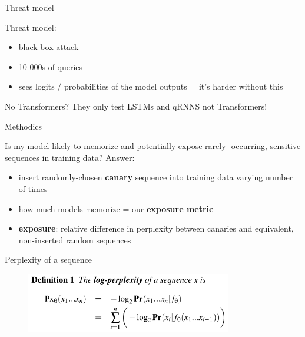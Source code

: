 \documentclass{beamer}
\begin{document}
\begin{frame}{Threat model}

Threat model:
\begin{itemize}
\item black box attack
\item 10 000s of queries
\item sees logits / probabilities of the model outputs = it's harder without this
\end{itemize}

\vfill

\begin{block}{No Transformers?}
They only test LSTMs and qRNNS not Transformers!
\end{block}

\end{frame}
\begin{frame}{Methodics}

Is my model likely to memorize and potentially expose rarely- occurring, sensitive sequences in training data?
\vfill
Answer:
\begin{itemize}
\item insert randomly-chosen \textbf{canary} sequence into training data varying number of times
\item how much models memorize = our \textbf{exposure metric} 
\item \textbf{exposure}: relative difference in perplexity between canaries and equivalent, non-inserted random sequences
\end{itemize}

\end{frame}
\begin{frame}{Perplexity of a sequence}

\begin{figure}[h]
\includegraphics[width=0.8\textwidth]{img/log-perp}
\end{figure}

\end{frame}
\end{document}

